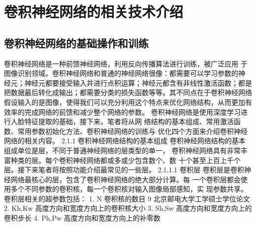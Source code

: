 \chapter{卷积神经网络的相关技术介绍}

\section{卷积神经网络的基础操作和训练}
卷积神经网络是一种前馈神经网络，利用反向传播算法进行训练，被广泛应用 于图像识别领域。卷积神经网络和普通的神经网络很像：都需要可以学习参数的神 经元；神经元都要接受输入并进行点积运算；神经元都含有非线性激活函数；都是 把数据最后转化成输出；都需要分类的损失函数等等。其不同点在于卷积神经网络 假设输入的是图像，使得我们可以充分利用这个特点来优化网络结构，从而更加有 效率的完成网络的前馈和减少整个网络的参数。 卷积神经网络是使用深度学习进行人脸特征提取的基础，接下来，笔者将从网 络结构的基本组成、常用激活函数、常用参数初始化方法、卷积神经网络的训练与 优化四个方面来介绍卷积神经网络的相关内容。
2.1.1 卷积神经网络结构的基本组成
卷积神经网络结构的基本组成单位是层，不同于普通神经网络的层类型的单一， 卷积神经网络具有非常丰富种类的层。每个卷积神经网络都或多或少包含数个、数 十个甚至上百上千个层。接下来笔者将按照功能介绍最常见的一些层。
2.1.1.1 卷积层
卷积层是卷积神经网络最核心的层，包含了卷积神经网络的绝大部分计算。每 一个卷积层都会使用多个不同参数的卷积核，每一个卷积核对输入图像局部感知，实 现参数共享。 卷积层相关的超参数包括：
1. N 卷积核的数目
9
北京邮电大学工学硕士学位论文
2. Kh,Kw 高度方向和宽度方向上的卷积核大小
3. Sh,Sw 高度方向和宽度方向上的卷积步长
4. Ph,Pw 高度方向和宽度方向上的补零数

